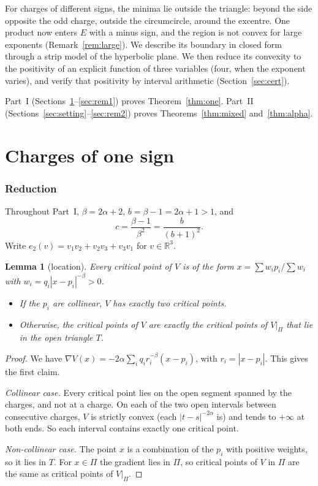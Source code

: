 \documentclass[11pt]{amsart}
\newtheorem{lemma}[theorem]{Lemma}
\theoremstyle{remark}
\newcommand{\R}{\mathbb{R}}
\begin{document}
For charges of different signs, the minima lie outside the triangle: beyond the side opposite the odd charge, outside
the circumcircle, around the excentre. One product now enters $E$ with a minus sign, and the region is not convex for
large exponents (Remark~\ref{rem:large}). We describe its boundary in closed form through a strip model of the
hyperbolic plane. We then reduce its convexity to the positivity of an explicit function of three variables (four, when
the exponent varies), and verify that positivity by interval arithmetic (Section~\ref{sec:cert}).

Part~I (Sections~\ref{sec:red}--\ref{sec:rem1}) proves Theorem~\ref{thm:one}. Part~II
(Sections~\ref{sec:setting}--\ref{sec:rem2}) proves Theorems~\ref{thm:mixed} and~\ref{thm:alpha}.

\part{Charges of one sign}

\section{Reduction}\label{sec:red}

Throughout Part~I, $\beta=2\alpha+2$, $b=\beta-1=2\alpha+1>1$, and
\[
  c=\frac{\beta-1}{\beta^2}=\frac{b}{(b+1)^2}.
\]
Write $e_2(v)=v_1v_2+v_2v_3+v_3v_1$ for $v\in\R^3$.

\begin{lemma}[location]\label{lem:loc}
Every critical point of $V$ is of the form $x=\sum w_ip_i/\sum w_i$ with $w_i=q_i|x-p_i|^{-\beta}>0$.
\begin{itemize}
\item If the $p_i$ are collinear, $V$ has exactly two critical points.
\item Otherwise, the critical points of $V$ are exactly the critical points of $V|_\Pi$ that lie in the open triangle
  $T$.
\end{itemize}
\end{lemma}

\begin{proof}
We have $\nabla V(x)=-2\alpha\sum_i q_i r_i^{-\beta}(x-p_i)$, with $r_i=|x-p_i|$. This gives the first claim.

\emph{Collinear case.} Every critical point lies on the open segment spanned by the charges, and not at a charge. On each
of the two open intervals between consecutive charges, $V$ is strictly convex (each $|t-s|^{-2\alpha}$ is) and tends to
$+\infty$ at both ends. So each interval contains exactly one critical point.

\emph{Non-collinear case.} The point $x$ is a combination of the $p_i$ with positive weights, so it lies in $T$. For
$x\in\Pi$ the gradient lies in $\Pi$, so critical points of $V$ in $\Pi$ are the same as critical points of $V|_\Pi$.
\end{proof}
\end{document}
